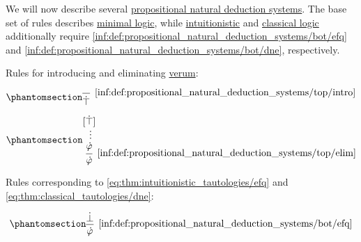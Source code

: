 \begin{definition}\label{def:propositional_natural_deduction_systems}
  We will now describe several \hyperref[def:abstract_natural_deduction_system]{propositional natural deduction systems}. The base set of rules describes \hyperref[con:minimal_logic]{minimal logic}, while \hyperref[con:intuitionistic_logic]{intuitionistic} and \hyperref[con:classical_logic]{classical logic} additionally require \ref{inf:def:propositional_natural_deduction_systems/bot/efq} and \ref{inf:def:propositional_natural_deduction_systems/bot/dne}, respectively.

  \begin{thmenum}
    \mimprovised Rules for introducing and eliminating \hyperref[def:propositional_alphabet/constants/verum]{verum}:
    \begin{paracol}{2}
      \ParacolAlignmentHack
      \begin{leftcolumn}
        \begin{equation*}\taglabel[\ensuremath{ \top_+ }]{inf:def:propositional_natural_deduction_systems/top/intro}
          \begin{prooftree}
            \infer0[\ref{inf:def:propositional_natural_deduction_systems/top/intro}]{ \syntop }
          \end{prooftree}
        \end{equation*}
      \end{leftcolumn}

      \begin{rightcolumn}
        \ParacolAlignmentHack
        \begin{equation*}\taglabel[\ensuremath{ \top_- }]{inf:def:propositional_natural_deduction_systems/top/elim}
          \begin{prooftree}
            \hypo{ [\syntop] }
            \ellipsis {} { \syn\varphi }
            \infer1[\ref{inf:def:propositional_natural_deduction_systems/top/elim}]{ \syn\varphi }
          \end{prooftree}
        \end{equation*}
      \end{rightcolumn}
    \end{paracol}

     Rules corresponding to \eqref{eq:thm:intuitionistic_tautologies/efq} and \eqref{eq:thm:classical_tautologies/dne}:
    \begin{paracol}{2}
      \ParacolAlignmentHack
      \begin{equation*}\taglabel[\logic{EFQ}]{inf:def:propositional_natural_deduction_systems/bot/efq}
        \begin{prooftree}
          \hypo{ \synbot }
          \infer1[\ref{inf:def:propositional_natural_deduction_systems/bot/efq}]{ \syn\varphi }
        \end{prooftree}
      \end{equation*}


\end{paracol}
\end{thmenum}
\end{definition}
